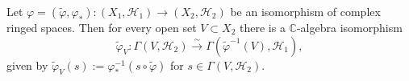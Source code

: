 Let $\varphi = (\tilde{\varphi}, \varphi_*): (X_1, \mathcal{H}_1) \rightarrow (X_2, \mathcal{H}_2)$ be an isomorphism of complex ringed spaces. Then for every open set $V \subset X_2$ there is a $\mathbb{C}$-algebra isomorphism
$$\tilde{\varphi}_V: \Gamma(V, \mathcal{H}_2) \xrightarrow{\sim} \Gamma(\tilde{\varphi}^{-1}(V), \mathcal{H}_1),$$
given by $\tilde{\varphi}_V(s) := \varphi_*^{-1}(s \circ \tilde{\varphi})$ for $s \in \Gamma(V, \mathcal{H}_2)$.
